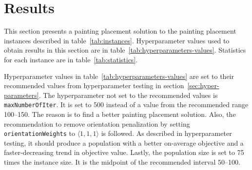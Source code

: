 \clearpage%
\newpage


\section{Results}\label{sec:results}
This section presents a painting placement solution to the painting placement instances described in table~\ref{tab:instances}.
Hyperparameter values used to obtain results in this section are in table~\ref{tab:hyperparameters-values}.
Statistics for each instance are in table~\ref{tab:statistics}.

Hyperparameter values in table~\ref{tab:hyperparameters-values} are set to their recommended values
from hyperparameter testing in section~\ref{sec:hyper-parameters}.
The hyperparameter not set to the recommended values is \verb|maxNumberOfIter|.
It is set to 500 instead of a value from the recommended range \numrange{100}{150}.
The reason is to find a better painting placement solution.
Also, the recommendation to remove orientation penalization by setting \verb|orientationWeights| to $\langle 1,1,1\rangle$ is followed.
As described in hyperparameter testing, it should produce a population with a better on-average objective and a faster-decreasing trend in objective value.
Lastly, the population size is set to 75 times the instance size.
It is the midpoint of the recommended interval \numrange{50}{100}.




